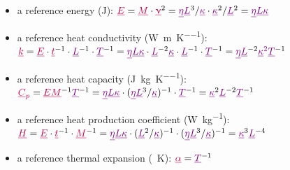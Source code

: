 \documentclass[a4paper,11pt]{article}
\begin{document}
\begin{itemize}
\item a reference energy (\si{\joule}):
${\color{purple}\underline{E}}
= {\color{purple}\underline{M}} \cdot {\color{purple}\underline{\upnu}}^2
= {\color{violet}\underline{\eta}} {\color{violet}\underline{L}}^3/ {\color{violet}\underline{\kappa}}  
\cdot {\color{violet}\underline{\kappa}}^2/{\color{violet}\underline{L}}^2
= {\color{violet} \underline{\eta} \underline{L}}   {\color{violet} \underline{\kappa}} 
$

\item a reference heat conductivity (\si{\watt\per\meter\per\kelvin}):
${\color{purple}\underline{k}}= {\color{purple}\underline{E}}\cdot {\color{purple}\underline{t}}^{-1} \cdot 
{\color{violet}\underline{L}}^{-1} \cdot {\color{violet}\underline{T}}^{-1}
= 
{\color{violet}\underline{\eta}} {\color{violet}\underline{L}} {\color{violet}\underline{\kappa}}
\cdot 
{\color{violet}\underline{L}}^{-2}  {\color{violet}\underline{\kappa}}
\cdot
{\color{violet}\underline{L}}^{-1} 
\cdot
{\color{violet}\underline{T}}^{-1}
=
{\color{violet} \underline{\eta}} {\color{violet} \underline{L}}^{-2} 
{\color{violet} \underline{\kappa}^2 \underline{T}}^{-1}
$



\item a reference heat capacity (\si{\joule\per\kg\per\kelvin}):
${\color{purple}\underline{C}_p}={\color{purple}\underline{E}} {\color{purple}\underline{M}}^{-1} 
{\color{violet}\underline{T}}^{-1} = 
{\color{violet} \underline{\eta} \underline{L}}   {\color{violet} \underline{\kappa}} 
\cdot 
({\color{violet} \underline{\eta}} {\color{violet} \underline{L}}^3/ {\color{violet} \underline{\kappa}})^{-1} \cdot {\color{violet} \underline{T}}^{-1}
= 
{\color{violet} \underline{\kappa}}^2 {\color{violet}  \underline{L}}^{-2}
{\color{violet} \underline{T}}^{-1}
$

\item a reference heat production coefficient (\si{\watt\per\kg}):
${\color{purple}\underline{H}}= {\color{purple}\underline{E}} 
\cdot {\color{purple}\underline{t}}^{-1} \cdot {\color{purple}\underline{M}}^{-1} 
= {\color{violet} \underline{\eta} \underline{L}}   {\color{violet} \underline{\kappa}} 
\cdot
({\color{violet} \underline{L}}^2 / {\color{violet} \underline{\kappa}})^{-1} 
\cdot
({\color{violet} \underline{\eta}} {\color{violet} \underline{L}}^3/ 
{\color{violet} \underline{\kappa}})^{-1}
= {\color{violet} \underline{\kappa}}^3 {\color{violet} \underline{L}}^{-4}
$

\item a reference thermal expansion (\si{\per\kelvin}): 
${\color{purple} \underline{\alpha}} = {\color{violet} \underline{T}}^{-1}$

\end{itemize}
\end{document}
